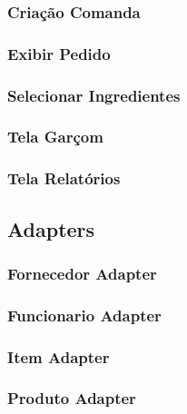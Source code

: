 \subsubsection{Criação Comanda}

\subsubsection{Exibir Pedido}

\subsubsection{Selecionar Ingredientes}

\subsubsection{Tela Garçom}

\subsubsection{Tela Relatórios}



\subsection{Adapters}

\subsubsection{Fornecedor Adapter}

\subsubsection{Funcionario Adapter}

\subsubsection{Item Adapter}

\subsubsection{Produto Adapter}


